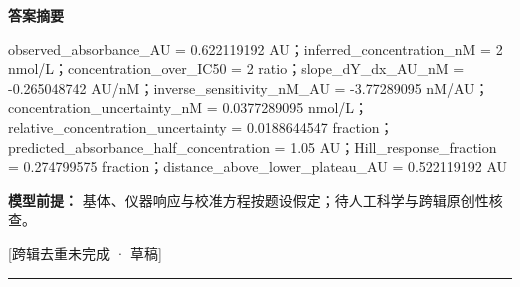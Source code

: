 \documentclass[UTF8,11pt,a4paper]{ctexart}
\begin{document}
\noindent\textbf{答案摘要}\par
observed\_absorbance\_AU = 0.622119192 AU；inferred\_concentration\_nM = 2 nmol/L；concentration\_over\_IC50 = 2 ratio；slope\_dY\_dx\_AU\_nM = -0.265048742 AU/nM；inverse\_sensitivity\_nM\_AU = -3.77289095 nM/AU；concentration\_uncertainty\_nM = 0.0377289095 nmol/L；relative\_concentration\_uncertainty = 0.0188644547 fraction；predicted\_absorbance\_half\_concentration = 1.05 AU；Hill\_response\_fraction = 0.274799575 fraction；distance\_above\_lower\_plateau\_AU = 0.522119192 AU\par
\noindent\textbf{模型前提：}
基体、仪器响应与校准方程按题设假定；待人工科学与跨辑原创性核查。\par
\noindent\textcolor{red!65!black}{[跨辑去重未完成 · 草稿]} \par
\medskip\hrule\medskip
{}
\end{document}
